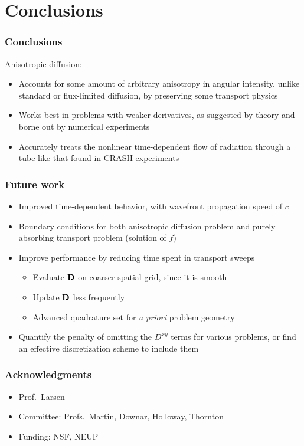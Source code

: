 \documentclass{beamer}
\newcommand{\Dtens}{\mat{D}}
\begin{document}
\section{Conclusions}
\begin{frame}
  \frametitle{Conclusions}
  Anisotropic diffusion:
  \begin{itemize}
    \item Accounts for some amount of arbitrary anisotropy in angular
      intensity, unlike standard or flux-limited diffusion, by preserving some
      transport physics
    \item Works best in problems with weaker derivatives, as suggested by
      theory and borne out by numerical experiments
    \item Accurately treats the nonlinear time-dependent flow of radiation
      through a tube like that found in CRASH experiments
  \end{itemize}
\end{frame}
\begin{frame}
  \frametitle{Future work}
  \begin{itemize}
    \item Improved time-dependent behavior, with wavefront propagation speed of
      $c$
    \item Boundary conditions for both anisotropic diffusion problem and
      purely absorbing transport problem (solution of $f$)
    \item Improve performance by reducing time spent in transport sweeps
      \begin{itemize}
        \item Evaluate $\Dtens$ on coarser spatial grid, since it is smooth
        \item Update $\Dtens$ less frequently
        \item Advanced quadrature set for \emph{a priori} problem geometry
      \end{itemize}
    \item Quantify the penalty of omitting the $D^{xy}$ terms for various
      problems, or find an effective discretization scheme to include them
  \end{itemize}
\end{frame}
\appendix
\begin{frame}
  \frametitle{Acknowledgments}
  \begin{itemize}
    \item Prof.~Larsen
    \item Committee: Profs.~Martin, Downar, Holloway, Thornton
    \item Funding: NSF, NEUP
  \end{itemize}
\end{frame}
\end{document}
